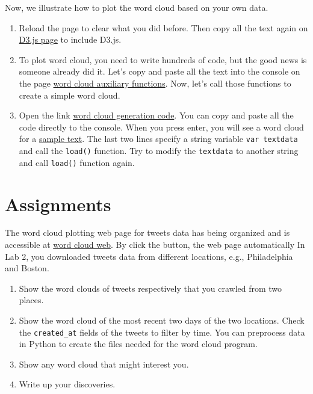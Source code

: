 \documentclass[a4paper, 11pt]{article}
\begin{document}
Now, we illustrate how to plot the word cloud based on your own data.
\begin{enumerate}
\item Reload the page to clear what you did before. Then copy all the text again on \href{https://raw.githubusercontent.com/mbostock/d3/master/d3.min.js}{D3.js page} to include D3.js.
\item To plot word cloud, you need to write hundreds of code, but the good news is someone already did it. Let's copy and paste all the text into the console on the page \href{http://nymph332088.github.io/CIS4340/labassignments/Lab4/auxiliary_functions.js}{word cloud auxiliary functions}. Now, let's call those functions to create a simple word cloud. 
\item Open the link \href{http://nymph332088.github.io/CIS4340/labassignments/Lab4/wordcloudgeneration.js}{word cloud generation code}. You can copy and paste all the code directly to the console. When you press enter, you will see a word cloud for a \href{http://www.jasondavies.com/wordtree/cat-in-the-hat.txt}{sample text}. The last two lines specify a string variable \texttt{var textdata} and call the \texttt{load()} function. Try to modify the \texttt{textdata} to another string and call \texttt{load()} function again. 
\end{enumerate}



\section{Assignments}
The word cloud plotting web page for tweets data has being organized and is accessible at \href{http://nymph332088.github.io/CIS4340/labassignments/Lab4/wordcloud.html}{word cloud web}. By click the button, the web page automatically 
In Lab 2, you downloaded tweets data from different locations, e.g., Philadelphia and Boston.
\begin{enumerate}
\item Show the word clouds of tweets respectively that you crawled from two places.
\item Show the word cloud of the most recent two days of the two locations. Check the \texttt{created_at} fields of the tweets to filter by time. You can preprocess data in Python to create the files needed for the word cloud program. 
\item Show any word cloud that might interest you.
\item Write up your discoveries.
\end{enumerate}
\end{document}

